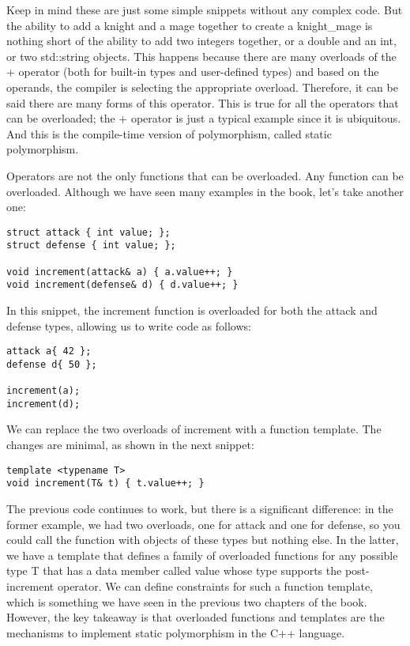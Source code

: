 Keep in mind these are just some simple snippets without any complex code. But the ability to add a knight and a mage together to create a knight\_mage is nothing short of the ability to add two integers together, or a double and an int, or two std::string objects. This happens because there are many overloads of the + operator (both for built-in types and user-defined types) and based on the operands, the compiler is selecting the appropriate overload. Therefore, it can be said there are many forms of this operator. This is true for all the operators that can be overloaded; the + operator is just a typical example since it is ubiquitous. And this is the compile-time version of polymorphism, called static polymorphism.

Operators are not the only functions that can be overloaded. Any function can be overloaded. Although we have seen many examples in the book, let’s take another one:

\begin{lstlisting}[style=styleCXX]
struct attack { int value; };
struct defense { int value; };

void increment(attack& a) { a.value++; }
void increment(defense& d) { d.value++; }
\end{lstlisting}

In this snippet, the increment function is overloaded for both the attack and defense types, allowing us to write code as follows:

\begin{lstlisting}[style=styleCXX]
attack a{ 42 };
defense d{ 50 };

increment(a);
increment(d);
\end{lstlisting}

We can replace the two overloads of increment with a function template. The changes are minimal, as shown in the next snippet:

\begin{lstlisting}[style=styleCXX]
template <typename T>
void increment(T& t) { t.value++; }
\end{lstlisting}

The previous code continues to work, but there is a significant difference: in the former example, we had two overloads, one for attack and one for defense, so you could call the function with objects of these types but nothing else. In the latter, we have a template that defines a family of overloaded functions for any possible type T that has a data member called value whose type supports the post-increment operator. We can define constraints for such a function template, which is something we have seen in the previous two chapters of the book. However, the key takeaway is that overloaded functions and templates are the mechanisms to implement static polymorphism in the C++ language.

